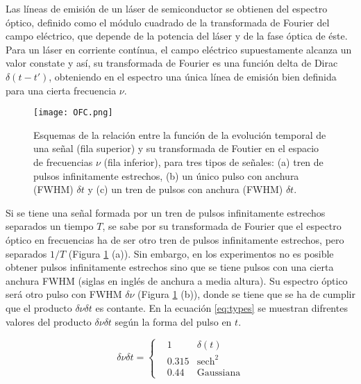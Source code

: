 
Las l\'ineas de emisi\'on de un l\'aser de semiconductor se obtienen del espectro \'optico, definido como el m\'odulo cuadrado de la transformada de Fourier del campo el\'ectrico, que depende de la potencia del l\'aser y de la fase \'optica de \'este. Para un l\'aser en corriente cont\'inua, el campo el\'ectrico supuestamente alcanza un valor constate y as\'i, su transformada de Fourier es una funci\'on delta de Dirac $\delta(t-t')$, obteniendo en el espectro una \'unica l\'inea de emisi\'on bien definida para una cierta frecuencia $\nu$.

	\begin{figure}[H]
		\centering
		\texttt{[image: OFC.png]}
		\caption{\label{Img:FFtPulsos}Esquemas de la relaci\'on entre la funci\'on de la evolución temporal de una señal (fila superior) y su transformada de Foutier en el espacio de frecuencias $\nu$ (fila inferior), para tres tipos de señales: (a) tren de pulsos infinitamente estrechos, (b) un \'unico pulso con anchura (FWHM) $\delta t$ y (c) un tren de pulsos con anchura (FWHM) $\delta t$.}
	\end{figure}

Si se tiene una señal formada por un tren de pulsos infinitamente estrechos separados un tiempo $T$, se sabe por su transformada de Fourier que el espectro \'optico en frecuencias ha de ser otro tren de pulsos infinitamente estrechos, pero separados $1/T$ (Figura \ref{Img:FFtPulsos} (a)). Sin embargo, en los experimentos no es posible obtener pulsos infinitamente estrechos sino que se tiene pulsos con una cierta anchura FWHM (siglas en ingl\'es de anchura a media altura). Su espectro \'optico ser\'a otro pulso con FWHM $\delta\nu$ (Figura \ref{Img:FFtPulsos} (b)), donde se tiene que se ha de cumplir que el producto $\delta\nu\delta t$ es contante. En la ecuaci\'on \ref{eq:types} se muestran difrentes valores del producto $\delta\nu\delta t$ seg\'un la forma del pulso en $t$.

	\begin{equation}
		\delta\nu\delta t = 
			\left\{\begin{matrix}
				& 1 & \delta(t) \\
				& 0.315 & \textrm{sech}^2 \\
				& 0.44 & \textrm{Gaussiana}
			\end{matrix}\right.
		\label{eq:types}
	\end{equation}

